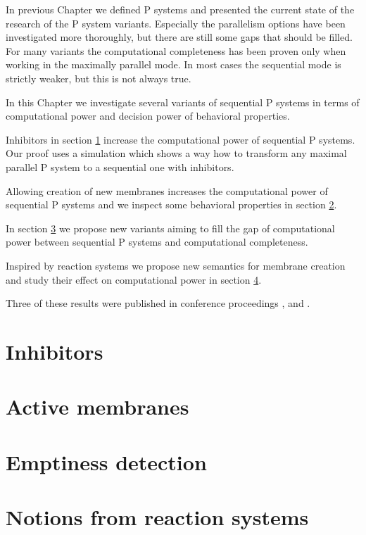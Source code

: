 In previous Chapter we defined P systems and presented the current state of the research of the P system variants. Especially the parallelism options have been investigated more thoroughly, but there are still some gaps that should be filled. For many variants the computational completeness has been proven only when working in the maximally parallel mode. In most cases the sequential mode is strictly weaker, but this is not always true.

In this Chapter we investigate several variants of sequential P systems in terms of computational power and decision power of behavioral properties.

Inhibitors in section \ref{sec:inhibitors} increase the computational power of sequential P systems. Our proof uses a simulation which shows a way how to transform any maximal parallel P system to a sequential one with inhibitors.

Allowing creation of new membranes increases the computational power of sequential P systems \cite{Ibarra05Active} and we inspect some behavioral properties in section \ref{sec:active_membranes}.

In section \ref{sec:emptiness_detection} we propose new variants aiming to fill the gap of computational power between sequential P systems and computational completeness.

Inspired by reaction systems we propose new semantics for membrane creation and study their effect on computational power in section \ref{sec:notions_from_reaction_systems}. 

Three of these results were published in conference proceedings \cite{Kovac14Inhibitors}, \cite{Kovac15TerminationProblems} and \cite{Kovac15SequentialActiveSet}. 

\section{Inhibitors} %
\label{sec:inhibitors}


\section{Active membranes} %
\label{sec:active_membranes}


\section{Emptiness detection} %
\label{sec:emptiness_detection}


\section{Notions from reaction systems} %
\label{sec:notions_from_reaction_systems}


